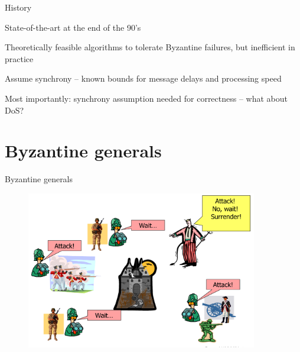 \begin{frame}{History}

\BIL
\item State-of-the-art at the end of the 90's
\BI
\item Theoretically feasible algorithms to tolerate Byzantine failures, but inefficient in practice
\item Assume synchrony – known bounds for message delays and processing speed
\item Most importantly: synchrony assumption needed for correctness – what about DoS?
\EI
\EIL

\bigskip
\begin{Bib}
\end{Bib}

\end{frame}

\section{Byzantine generals}

\begin{frame}{Byzantine generals}
	
\begin{figure}
	\includegraphics[width=0.9\textwidth]{generals}
\end{figure}

\end{frame}

